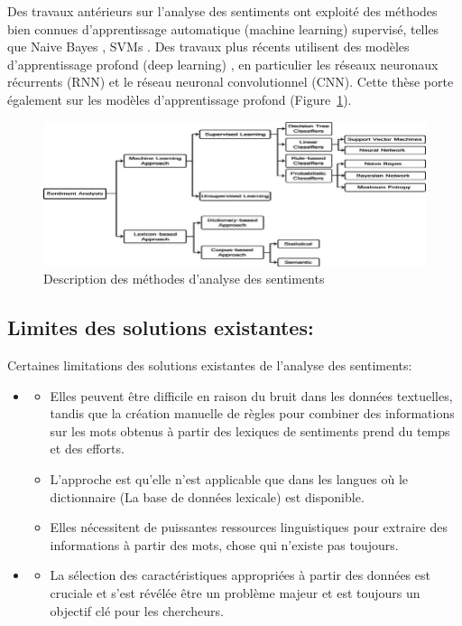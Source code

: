 Des travaux antérieurs sur l'analyse des sentiments ont exploité des méthodes bien connues d'apprentissage automatique (machine learning) supervisé, telles que Naive Bayes \cite{martinez2006learning}, SVMs \cite{vinet2011missing, ho1995random,wahid2017prestasi}. Des travaux plus récents utilisent des modèles d'apprentissage profond (deep learning) \cite{goldberg2017neural}, en particulier les réseaux neuronaux récurrents (RNN) et le réseau neuronal convolutionnel (CNN). Cette thèse porte également sur les modèles d'apprentissage profond (Figure~\ref{fig:methodessentiment}).
\begin{figure}
    \centering
    \includegraphics[width=\textwidth]{etude-theorique-conception/assets/sentiment-analysis-methods.jpg}
    \caption{Description des méthodes d'analyse des sentiments}
    \label{fig:methodessentiment}
\end{figure}

\subsection{Limites des solutions existantes:}
Certaines limitations des solutions existantes de l'analyse des sentiments:
\begin{itemize}
    \item {}
          \begin{itemize}
              \item Elles peuvent être difficile en raison du bruit dans les données textuelles, tandis que la création manuelle de règles pour combiner des informations sur les mots obtenus à partir des lexiques de sentiments prend du temps et des efforts.
              \item L'approche est qu'elle n'est applicable que dans les langues où le dictionnaire (La base de données lexicale) est disponible.
              \item Elles nécessitent de puissantes ressources linguistiques pour extraire des informations à partir des mots, chose qui n'existe pas toujours.
          \end{itemize}
    \item {}
          \begin{itemize}
              \item La sélection des caractéristiques appropriées à partir des données est cruciale et s'est révélée être un problème majeur et est toujours un objectif clé pour les chercheurs.
          \end{itemize}
\end{itemize}
